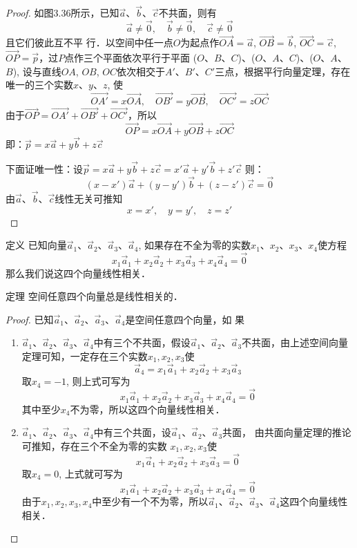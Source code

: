 \begin{proof}
如图3.36所示，已知$\vec{a}$、$\vec{b}$、$\vec{c}$不共面，则有
\[\vec{a}\ne \vec{0},\quad \vec{b}\ne\vec{0},\quad \vec{c}\ne \vec{0}\]
且它们彼此互不平
行．以空间中任一点$O$为起点作$\Vec{OA}=\vec{a}$, $\Vec{OB}=\vec{b}$, $\Vec{OC}=\vec{c}$, $\Vec{OP}=\vec{p}$，过$P$点作三个平面依次平行于平面
($O$、$B$、$C$)、($O$、$A$、$C$)、($O$、$A$、$B$), 设与直线$OA$, $
OB$, $OC$依次相交于$A'$、$B'$、$C'$三点，根据平行向量定理，存在
唯一的三个实数$x$、$y$、$z$, 使
\[\Vec{OA'}=x\Vec{OA},\quad \Vec{OB'}=y\Vec{OB},\quad \Vec{OC'}=z\Vec{OC}\]
由于$\Vec{OP}=\Vec{OA'}+\Vec{OB'}+\Vec{OC'}$，所以
\[\Vec{OP}=x\Vec{OA}+y\Vec{OB}+z\Vec{OC}\]
即：$\vec{p}=x\vec{a}+y\vec{b}+z\vec{c}$

下面证唯一性：设$\vec{p}=x\vec{a}+y\vec{b}+z\vec{c}=x'\vec{a}+y'\vec{b}+z'\vec{c}$
则：
\[(x-x')\vec{a}+(y-y')\vec{b}+(z-z')\vec{c}=\vec{0}\]
由$\vec{a}$、$\vec{b}$、$\vec{c}$线性无关可推知
\[x=x',\quad y=y',\quad z=z'\]
\end{proof}

\begin{blk}
    {定义} 已知向量$\vec{a}_1$、$\vec{a}_2$、$\vec{a}_3$、$\vec{a}_4$, 如果存在不全为零的实数$x_1$、$x_2$、$x_3$、$x_4$使方程
    \[x_1\vec{a}_1+x_2\vec{a}_2+x_3\vec{a}_3+x_4\vec{a}_4=\vec{0}\]
    那么我们说这四个向量线性相关．
\end{blk}

\begin{blk}
    {定理}
空间任意四个向量总是线性相关的．
\end{blk}

\begin{proof}
    已知$\vec{a}_1$、$\vec{a}_2$、$\vec{a}_3$、$\vec{a}_4$是空间任意四个向量，如
果
\begin{enumerate}
    \item $\vec{a}_1$、$\vec{a}_2$、$\vec{a}_3$、$\vec{a}_4$中有三个不共面，假设$\vec{a}_1$、$\vec{a}_2$、$\vec{a}_3$不共面，由上述空间向量定理可知，一定存在三个实数$x_1,x_2,x_3$使
\[\vec{a}_4=x_1\vec{a}_1+x_2\vec{a}_2+x_3\vec{a}_3\]
取$x_4=-1$, 则上式可写为
\[x_1\vec{a}_1+x_2\vec{a}_2+x_3\vec{a}_3+x_4\vec{a}_4=\vec{0}\]
其中至少$x_4$不为零，所以这四个向量线性相关．
\item $\vec{a}_1$、$\vec{a}_2$、$\vec{a}_3$、$\vec{a}_4$中有三个共面，设$\vec{a}_1$、$\vec{a}_2$、$\vec{a}_3$共面，
由共面向量定理的推论可推知，存在三个不全为零的实数
$x_1,x_2,x_3$使
\[x_1\vec{a}_1+x_2\vec{a}_2+x_3\vec{a}_3=\vec{0}\]
取$x_4=0$, 上式就可写为
\[x_1\vec{a}_1+x_2\vec{a}_2+x_3\vec{a}_3+x_4\vec{a}_4=\vec{0}\]
由于$x_1,x_2,x_3,x_4$中至少有一个不为零，所以$\vec{a}_1$、$\vec{a}_2$、$\vec{a}_3$、$\vec{a}_4$这四个向量线性相关．
\end{enumerate}

\end{proof}

